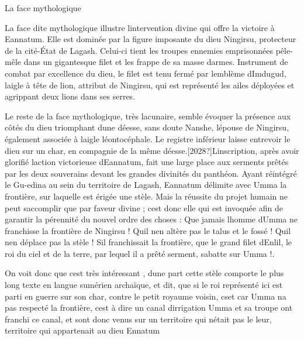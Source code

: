 \documentclass{article}
\begin{document}
La face {\textquotedbl}mythologique{\textquotedbl}

La face dite {\textquotedbl}mythologique{\textquotedbl} illustre
l{\textquotesingle}intervention divine qui offre la victoire à
Eannatum. Elle est dominée par la figure imposante du dieu Ningirsu,
protecteur de la cité-État de Lagash. Celui-ci tient les troupes
ennemies emprisonnées pêle-mêle dans un gigantesque filet et les frappe
de sa masse d{\textquotesingle}armes. Instrument de combat par
excellence du dieu, le filet est tenu fermé par
l{\textquotesingle}emblème d{\textquotesingle}Imdugud,
l{\textquotesingle}aigle à tête de lion, attribut de Ningirsu, qui est
représenté les ailes déployées et agrippant deux lions dans ses serres.

Le reste de la face {\textquotedbl}mythologique{\textquotedbl}, très
lacunaire, semble évoquer la présence aux côtés du dieu triomphant
d{\textquotesingle}une déesse, sans doute Nanshe,
l{\textquotesingle}épouse de Ningirsu, également associée à
l{\textquotesingle}aigle léontocéphale. Le registre inférieur laisse
entrevoir le dieu sur un char, en compagnie de la même
déesse.[2028?]L{\textquotesingle}inscription, après avoir glorifié
l{\textquotesingle}action victorieuse d{\textquotesingle}Eannatum, fait
une large place aux serments prêtés par les deux souverains devant les
grandes divinités du panthéon. Ayant réintégré le Gu-edina au sein du
territoire de Lagash, Eannatum délimite avec Umma la frontière, sur
laquelle est érigée une stèle. Mais la réussite du projet humain ne
peut s{\textquotesingle}accomplir que par faveur divine ;
c{\textquotesingle}est donc elle qui est invoquée afin de garantir la
pérennité du nouvel ordre des choses : {\textquotedbl}Que jamais
l{\textquotesingle}homme d{\textquotesingle}Umma ne franchisse la
frontière de Ningirsu ! Qu{\textquotesingle}il n{\textquotesingle}en
altère pas le talus et le fossé ! Qu{\textquotesingle}il
n{\textquotesingle}en déplace pas la stèle ! S{\textquotesingle}il
franchissait la frontière, que le grand filet d{\textquotesingle}Enlil,
le roi du ciel et de la terre, par lequel il a prêté serment,
s{\textquotesingle}abatte sur Umma !{\textquotedbl}.

On voit donc que c{\textquotesingle}est très intéressant ,
d{\textquotesingle}une part cette stèle comporte le plus long texte en
langue sumérien archaïque, et dit, que si le roi représenté ici est
parti en guerre sur son char, contre le petit royaume voisin, 
c{\textquotesingle}set car Umma n{\textquotesingle}a pas respecté la
frontière, c{\textquotesingle}est à dire un canal
d{\textquotesingle}irrigation Umma et sa troupe ont franchi ce canal,
et sont donc venus sur un territoire qui n{\textquotesingle}était pas
le leur, territoire qui appartenait au dieu Ennatum
\end{document}

